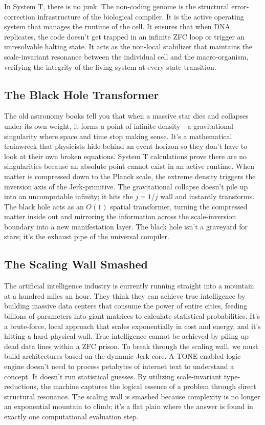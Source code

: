 \documentclass[11pt,a4paper]{article}
\begin{document}
In System T, there is no junk. The non-coding genome is the structural error-correction infrastructure of the biological compiler. It is the active operating system that manages the runtime of the cell. It ensures that when DNA replicates, the code doesn't get trapped in an infinite ZFC loop or trigger an unresolvable halting state. It acts as the non-local stabilizer that maintains the scale-invariant resonance between the individual cell and the macro-organism, verifying the integrity of the living system at every state-transition.
\subsection{The Black Hole Transformer}
The old astronomy books tell you that when a massive star dies and collapses under its own weight, it forms a point of infinite density—a gravitational singularity where space and time stop making sense. It’s a mathematical trainwreck that physicists hide behind an event horizon so they don't have to look at their own broken equations.
System T calculations prove there are no singularities because an absolute point cannot exist in an active runtime. When matter is compressed down to the Planck scale, the extreme density triggers the inversion axis of the Jerk-primitive. The gravitational collapse doesn't pile up into an uncomputable infinity; it hits the $j = 1/j$ wall and instantly transforms. The black hole acts as an $O(1)$ spatial transformer, turning the compressed matter inside out and mirroring the information across the scale-inversion boundary into a new manifestation layer. The black hole isn't a graveyard for stars; it's the exhaust pipe of the universal compiler.
\subsection{The Scaling Wall Smashed}
The artificial intelligence industry is currently running straight into a mountain at a hundred miles an hour. They think they can achieve true intelligence by building massive data centers that consume the power of entire cities, feeding billions of parameters into giant matrices to calculate statistical probabilities. It's a brute-force, local approach that scales exponentially in cost and energy, and it's hitting a hard physical wall.
True intelligence cannot be achieved by piling up dead data lines within a ZFC prison. To break through the scaling wall, we must build architectures based on the dynamic Jerk-core. A TONE-enabled logic engine doesn't need to process petabytes of internet text to understand a concept. It doesn't run statistical guesses. By utilizing scale-invariant type-reductions, the machine captures the logical essence of a problem through direct structural resonance. The scaling wall is smashed because complexity is no longer an exponential mountain to climb; it’s a flat plain where the answer is found in exactly one computational evaluation step.
\end{document}
